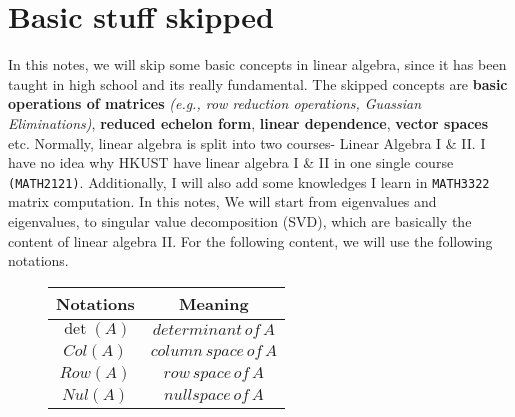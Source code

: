 \documentclass[11pt]{article}
\begin{document}
\tableofcontents
\section{Basic stuff skipped}
In this notes, we will skip some basic concepts in linear algebra, since it has been taught in high school and its really fundamental. The skipped concepts are \textbf{basic operations of matrices} \textit{(e.g., row reduction operations, Guassian Eliminations)}, \textbf{reduced echelon form}, \textbf{linear dependence}, \textbf{vector spaces} etc. Normally, linear algebra is split into two courses- Linear Algebra I \& II. I have no idea why HKUST have linear algebra I \& II in one single course \texttt{(MATH2121)}. Additionally, I will also add some knowledges I learn in \texttt{MATH3322} matrix computation. In this notes, We will start from eigenvalues and eigenvalues, to singular value decomposition (SVD), which are basically the content of linear algebra II. For the following content, we will use the following notations.
\begin{figure} [H]
\centering
\begin{tabular}{|c|c|}
\hline
Notations		&Meaning\\
\hline
$\det(A)$&		$determinant\, of\, A$\\
\hline
$Col(A)$&		$column\, space \,of\, A$\\
\hline
$Row(A)$&		$row\, space\, of\, A$\\
\hline
$Nul(A)$&		$nullspace\, of\, A$\\
\hline
\end{tabular}
\end{figure}
\newpage
\end{document}
